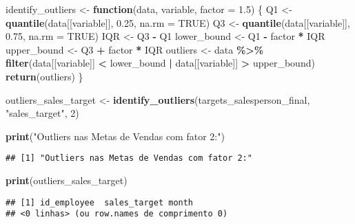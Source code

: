 \documentclass[
]{article}
\newenvironment{Shaded}{\begin{snugshade}}{\end{snugshade}}
\newcommand{\AttributeTok}[1]{\textcolor[rgb]{0.13,0.29,0.53}{#1}}
\newcommand{\ConstantTok}[1]{\textcolor[rgb]{0.56,0.35,0.01}{#1}}
\newcommand{\ControlFlowTok}[1]{\textcolor[rgb]{0.13,0.29,0.53}{\textbf{#1}}}
\newcommand{\DecValTok}[1]{\textcolor[rgb]{0.00,0.00,0.81}{#1}}
\newcommand{\FloatTok}[1]{\textcolor[rgb]{0.00,0.00,0.81}{#1}}
\newcommand{\FunctionTok}[1]{\textcolor[rgb]{0.13,0.29,0.53}{\textbf{#1}}}
\newcommand{\NormalTok}[1]{#1}
\newcommand{\OtherTok}[1]{\textcolor[rgb]{0.56,0.35,0.01}{#1}}
\newcommand{\SpecialCharTok}[1]{\textcolor[rgb]{0.81,0.36,0.00}{\textbf{#1}}}
\newcommand{\StringTok}[1]{\textcolor[rgb]{0.31,0.60,0.02}{#1}}
\begin{document}
\begin{Shaded}
\begin{Highlighting}[]
\NormalTok{identify\_outliers }\OtherTok{\textless{}{-}} \ControlFlowTok{function}\NormalTok{(data, variable, }\AttributeTok{factor =} \FloatTok{1.5}\NormalTok{) \{}
\NormalTok{  Q1 }\OtherTok{\textless{}{-}} \FunctionTok{quantile}\NormalTok{(data[[variable]], }\FloatTok{0.25}\NormalTok{, }\AttributeTok{na.rm =} \ConstantTok{TRUE}\NormalTok{)}
\NormalTok{  Q3 }\OtherTok{\textless{}{-}} \FunctionTok{quantile}\NormalTok{(data[[variable]], }\FloatTok{0.75}\NormalTok{, }\AttributeTok{na.rm =} \ConstantTok{TRUE}\NormalTok{)}
\NormalTok{  IQR }\OtherTok{\textless{}{-}}\NormalTok{ Q3 }\SpecialCharTok{{-}}\NormalTok{ Q1}
\NormalTok{  lower\_bound }\OtherTok{\textless{}{-}}\NormalTok{ Q1 }\SpecialCharTok{{-}}\NormalTok{ factor }\SpecialCharTok{*}\NormalTok{ IQR}
\NormalTok{  upper\_bound }\OtherTok{\textless{}{-}}\NormalTok{ Q3 }\SpecialCharTok{+}\NormalTok{ factor }\SpecialCharTok{*}\NormalTok{ IQR}
\NormalTok{  outliers }\OtherTok{\textless{}{-}}\NormalTok{ data }\SpecialCharTok{\%\textgreater{}\%} \FunctionTok{filter}\NormalTok{(data[[variable]] }\SpecialCharTok{\textless{}}\NormalTok{ lower\_bound }\SpecialCharTok{|}\NormalTok{ data[[variable]] }\SpecialCharTok{\textgreater{}}\NormalTok{ upper\_bound)}
  \FunctionTok{return}\NormalTok{(outliers)}
\NormalTok{\}}

\NormalTok{outliers\_sales\_target }\OtherTok{\textless{}{-}} \FunctionTok{identify\_outliers}\NormalTok{(targets\_salesperson\_final, }\StringTok{"sales\_target"}\NormalTok{, }\DecValTok{2}\NormalTok{)}

\FunctionTok{print}\NormalTok{(}\StringTok{"Outliers nas Metas de Vendas com fator 2:"}\NormalTok{)}
\end{Highlighting}
\end{Shaded}

\begin{verbatim}
## [1] "Outliers nas Metas de Vendas com fator 2:"
\end{verbatim}

\begin{Shaded}
\begin{Highlighting}[]
\FunctionTok{print}\NormalTok{(outliers\_sales\_target)}
\end{Highlighting}
\end{Shaded}

\begin{verbatim}
## [1] id_employee  sales_target month       
## <0 linhas> (ou row.names de comprimento 0)
\end{verbatim}
\end{document}
